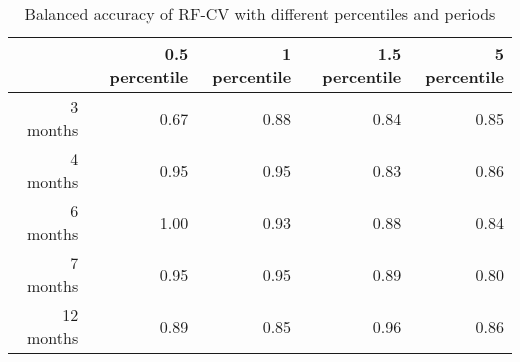 \begin{table}[ht]
\centering
\begin{tabular}{rrrrr}
  \hline
 & 0.5 percentile & 1 percentile & 1.5 percentile & 5 percentile \\ 
  \hline
3 months & 0.67 & 0.88 & 0.84 & 0.85 \\ 
  4 months & 0.95 & 0.95 & 0.83 & 0.86 \\ 
  6 months & 1.00 & 0.93 & 0.88 & 0.84 \\ 
  7 months & 0.95 & 0.95 & 0.89 & 0.80 \\ 
  12 months & 0.89 & 0.85 & 0.96 & 0.86 \\ 
   \hline
\end{tabular}
\caption{Balanced accuracy of RF-CV with different percentiles and periods} 
\label{tab:rob}
\end{table}
